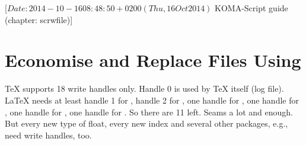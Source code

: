 %
%
%
%
%
%
%
%
% 
%
%
%
%

%
                 [$Date: 2014-10-16 08:48:50 +0200 (Thu, 16 Oct 2014) $
                  KOMA-Script guide (chapter: scrwfile)]


\chapter[{Economise and Replace Files Using \Package{scrwfile}}]
{Economise and Replace Files Using %
}


\TeX{} supports 18 write handles only. Handle 0 is used by \TeX{} itself (log
file). \LaTeX{} needs at least handle 1 for , handle 2 for
, one handle for , one handle for
, one handle for , one handle for
. So there are 11 left. Seams a lot and enough. But every new
type of float, every new index and several other packages, e.g.,
 need write handles, too.

